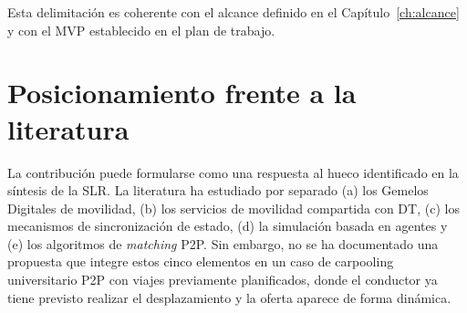 Esta delimitación es coherente con el alcance definido en el Capítulo~\ref{ch:alcance} y con el MVP establecido en el plan de trabajo.

\section{Posicionamiento frente a la literatura}

La contribución puede formularse como una respuesta al hueco identificado en la síntesis de la SLR. La literatura ha estudiado por separado (a) los Gemelos Digitales de movilidad, (b) los servicios de movilidad compartida con DT, (c) los mecanismos de sincronización de estado, (d) la simulación basada en agentes y (e) los algoritmos de \textit{matching} P2P. Sin embargo, no se ha documentado una propuesta que integre estos cinco elementos en un caso de carpooling universitario P2P con viajes previamente planificados, donde el conductor ya tiene previsto realizar el desplazamiento y la oferta aparece de forma dinámica.
